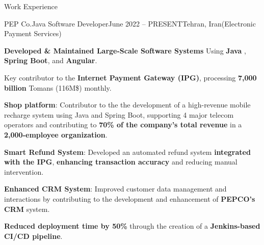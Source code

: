 \documentclass[]{kyvernitis-resume}
\begin{document}
\begin{section}{Work Experience}
    \begin{subsection}{PEP Co.}{Java Software Developer}{June 2022 -- PRESENT}{Tehran, Iran}{(Electronic Payment Services)}

		\item \textbf{Developed \& Maintained Large-Scale Software Systems} Using \textbf{Java} , \textbf{Spring Boot}, and \textbf{Angular}.

		\item Key contributor to the \textbf{Internet Payment Gateway (IPG)}, processing \textbf{7,000 billion} Tomans (116M\$) monthly.
		
		\item \textbf{Shop platform}: Contributor to the the development of a high-revenue mobile recharge system using Java and Spring Boot, supporting 4 major telecom operators and contributing to \textbf{70\% of the company’s total revenue} in a \textbf{2,000-employee organization}.
		\item \textbf{Smart Refund System}: Developed an automated refund system \textbf{integrated with the IPG}, \textbf{enhancing transaction accuracy} and reducing manual intervention.

		\item \textbf{Enhanced CRM System}: Improved customer data management and interactions by contributing to the development and enhancement of \textbf{PEPCO's CRM} system.
			
		\item  \textbf{Reduced deployment time by 50\%} through the creation of a \textbf{Jenkins-based CI/CD pipeline}.

		

\end{subsection}
\end{section}
\end{document}

